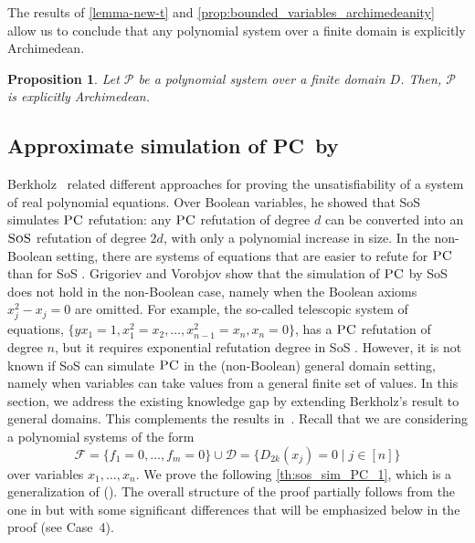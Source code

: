 \documentclass[11pt]{article}
\newcommand{\sos}{\text{\sc{SoS}}}
\newcommand{\F}{\mathcal{F}}
\newcommand{\PC}{\textsc{PC}}
\newcommand{\1}{\textbf{1}}
\newcommand{\Do}{\mathcal{D}}
\newtheorem{proposition}[theorem]{Proposition}
\begin{document}
The results of \cref{lemma-new-t} and \cref{prop:bounded_variables_archimedeanity} allow us to conclude that any polynomial system over a finite domain is explicitly Archimedean.
\begin{proposition}\label{prop:finite-archi}
    Let $\mathcal{P}$ be a polynomial system over a finite domain $D$. Then, $\mathcal{P}$ is explicitly Archimedean.
\end{proposition} 




\subsection{Approximate simulation of \PC\ by \sos}\label{sect:proof_sos_sim_PC}


Berkholz~\cite{berkholz18} related different approaches for proving the unsatisfiability of a system of real polynomial equations. Over Boolean variables, he showed that SoS simulates $\PC$ refutation: any \(\PC\) refutation of degree \(d\) can be converted into an \(\sos\) refutation of degree \(2d\), with only a polynomial increase in size.
In the non-Boolean setting, there are systems of equations that are easier to refute for $\PC$ than for SoS \cite{GrigorievV01}. Grigoriev and Vorobjov \cite{GrigorievV01} show that the simulation of $\PC$ by SoS does not hold in the non-Boolean case, namely when the Boolean axioms $x_j^2-x_j=0$ are omitted. For example, the so-called telescopic system of equations, $\{ yx_1=1, x_1^2=x_2, \ldots, x_{n-1}^2=x_n, x_n=0\}$, has a $\PC$ refutation of degree $n$, but it requires exponential refutation degree in SoS \cite{GrigorievV01}.
However, it is not known if SoS can simulate $\PC$ in the (non-Boolean) general domain setting, namely when variables can take values from a general finite set of values. 
In this section, we address the existing knowledge gap by extending Berkholz's result to general domains. This complements the results in~\cite{GrigorievV01,berkholz18}.
Recall that we are considering a polynomial systems of the form 
\begin{equation}
    \F=\{f_1=0,\ldots,f_m=0\} \cup \Do=\{D_{2k}(x_j)=0\mid j\in[n]\}
\end{equation}
over variables $x_1,\ldots,x_n$. We prove the following \cref{th:sos_sim_PC_1}, which is a generalization of (\cite[Lemma 1]{berkholz18}). The overall structure of the proof partially follows from the one in \cite{berkholz18} but with some significant differences that will be emphasized below in the proof (see Case~4).
\end{document}
